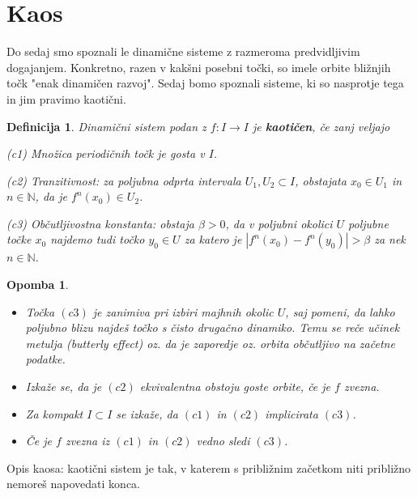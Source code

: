 \documentclass{article}
\newtheorem{definicija}{Definicija}
\newtheorem{opomba}{Opomba}
\newcommand{\N}{\mathbb{N}}
\begin{document}
\section{Kaos}
Do sedaj smo spoznali le dinamične sisteme z razmeroma predvidljivim dogajanjem. Konkretno, razen v kakšni posebni točki, so imele orbite bližnjih točk "enak dinamičen razvoj". Sedaj bomo spoznali sisteme, ki so nasprotje tega in jim pravimo kaotični. 

\begin{definicija}
Dinamični sistem podan z $f:I \rightarrow I$ je \textbf{kaotičen}, če zanj veljajo
\item[(c1)] Množica periodičnih točk je gosta v $I$.
\item[(c2)] Tranzitivnost: za poljubna odprta intervala $U_1, U_2 \subset I$, obstajata $x_0\in U_1$ in $n\in \N$, da je $f^n(x_0) \in U_2$.
\item[(c3)] Občutljivostna konstanta: obstaja $\beta > 0$, da v poljubni okolici $U$ poljubne točke $x_0$ najdemo tudi točko $y_0 \in U$ za katero je $|f^n(x_0) - f^n(y_0)| > \beta$ za nek $n\in \N$.
\end{definicija}

\begin{opomba}
\hfill 
\begin{itemize}
\item Točka $(c3)$ je zanimiva pri izbiri majhnih okolic $U$, saj pomeni, da lahko poljubno blizu najdeš točko s čisto drugačno dinamiko. Temu se reče učinek metulja (butterly effect) oz. da je zaporedje oz. orbita občutljivo na začetne podatke.
\item Izkaže se, da je $(c2)$ ekvivalentna obstoju goste orbite, če je $f$ zvezna.
\item Za kompakt $I \subset I$ se izkaže, da $(c1)$ in $(c2)$ implicirata $(c3)$.
\item Če je $f$ zvezna iz $(c1)$ in $(c2)$ vedno sledi $(c3)$.
\end{itemize}
\end{opomba}
Opis kaosa: kaotični sistem je tak, v katerem s približnim začetkom niti približno nemoreš napovedati konca.
\end{document}

